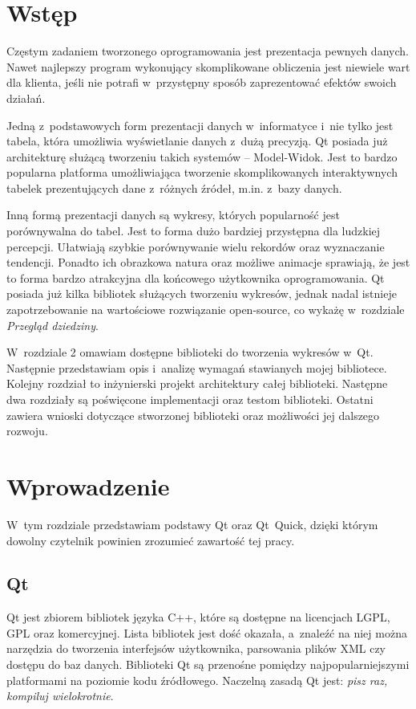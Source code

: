 \chapter*{Wstęp}
Częstym zadaniem tworzonego oprogramowania jest prezentacja pewnych danych. Nawet najlepszy program wykonujący skomplikowane obliczenia jest niewiele wart dla klienta, jeśli nie potrafi w~przystępny sposób zaprezentować efektów swoich działań.
 
Jedną z~podstawowych form prezentacji danych w~informatyce i~nie tylko jest tabela, która umożliwia wyświetlanie danych z~dużą precyzją. Qt posiada już architekturę służącą tworzeniu takich systemów -- Model-Widok. Jest to bardzo popularna platforma umożliwiająca tworzenie skomplikowanych interaktywnych tabelek prezentujących dane z~różnych źródeł, m.in. z~bazy danych.

Inną formą prezentacji danych są wykresy, których popularność jest porównywalna do tabel. Jest to forma dużo bardziej przystępna dla ludzkiej percepcji. Ułatwiają szybkie porównywanie wielu rekordów oraz wyznaczanie tendencji. Ponadto ich obrazkowa natura oraz możliwe animacje sprawiają, że jest to forma bardzo atrakcyjna dla końcowego użytkownika oprogramowania.
Qt posiada już kilka bibliotek służących tworzeniu wykresów, jednak nadal istnieje zapotrzebowanie na wartościowe rozwiązanie open-source, co wykażę w~rozdziale \textit{Przegląd dziedziny}.

W~rozdziale 2 omawiam dostępne biblioteki do tworzenia wykresów w~Qt. Następnie przedstawiam opis i~analizę wymagań stawianych mojej bibliotece. Kolejny rozdział to inżynierski projekt architektury całej biblioteki. Następne dwa rozdziały są poświęcone implementacji oraz testom biblioteki. Ostatni  zawiera wnioski dotyczące stworzonej biblioteki oraz możliwości jej dalszego rozwoju. 

\chapter{Wprowadzenie}
W~tym rozdziale przedstawiam podstawy Qt oraz Qt~Quick, dzięki którym dowolny czytelnik powinien zrozumieć zawartość tej pracy.

\section{Qt}
Qt jest zbiorem bibliotek języka C++, które są dostępne na licencjach LGPL, GPL oraz komercyjnej. Lista bibliotek jest dość okazała, a~znaleźć na niej można narzędzia do tworzenia interfejsów użytkownika, parsowania plików XML czy dostępu do baz danych. Biblioteki Qt są przenośne pomiędzy najpopularniejszymi platformami na poziomie kodu źródłowego. Naczelną zasadą Qt jest: \textit{pisz raz, kompiluj wielokrotnie}. 


